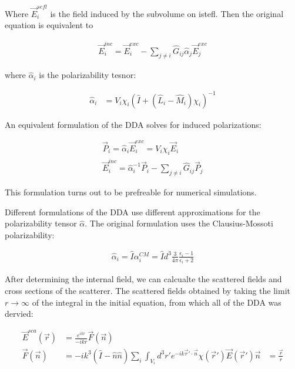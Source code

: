             Where $\vec{E}_i^{sefl}$ is the field induced by the subvolume on istefl. Then the original equation is equivalent to

            \begin{align}
                \vec{E}_i^{inc} = \vec{E}_i^{exc} - \sum_{j\neq i}\hat{G}_{ij}\hat{\alpha}_j\vec{E}_j^{exc}
            \end{align}

            where $\hat{\alpha}_i$ is the polarizability tesnor:

            \begin{align}
                \hat{\alpha}_i &= V_i\chi_i\left(\hat{I} + \left(\hat{L}_i - \hat{M}_i\right)\chi_i\right)^{-1}
            \end{align}

            An equivalent formulation of the DDA solves for induced polarizations:

            \begin{align}
                \vec{P}_i = \hat{\alpha}_i\vec{E}_i^{exc} = V_i\chi_i\vec{E}_i \\
                \vec{E}_i^{inc} = \hat{\alpha}_i^{-1}\vec{P}_i - \sum_{j \neq i} \hat{G}_{ij}\vec{P}_j
            \end{align}

            This formulation turns out to be prefreable for numerical simulations.

            Different formulations of the DDA use different approximations for the polarizability tensor $\hat{\alpha}$. The original
            formulation uses the Clausius-Mossoti polarizability:

            \begin{align}
                \hat{\alpha}_i = \hat{I}\alpha_i^{CM} = \hat{I}d^3\frac{3}{4\pi}\frac{\epsilon_i -1}{\epsilon_i + 2}
            \end{align}

            After determining the internal field, we can calcualte the scattered fields and cross sections of the scatterer. The
            scattered fields obtained by taking the limit $r \rightarrow \infty$ of the integral in the initial equation, from which
            all of the DDA was dervied:

            \begin{align}
                \vec{E}^{sca}(\vec{r}) &= \frac{e^{ikr}}{-ikr}\vec{F}(\vec{n}) \\
                \vec{F}(\vec{n}) &= -ik^3\left(\hat{I}
                                    - \hat{n}\hat{n}\right)\sum_i \int_{V_i}d^3r'e^{-ik\vec{r}'\cdot\vec{n}}\chi(\vec{r}')\vec{E}(\vec{r}')
                \vec{n} &= \frac{\vec{r}}{r}
            \end{align}

